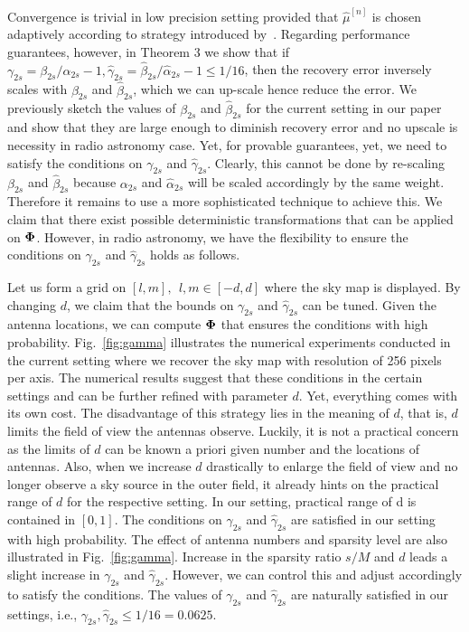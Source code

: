 \documentclass[aoas,preprint]{imsart}
\numberwithin{equation}{section}
\theoremstyle{plain}
\begin{document}
{Convergence is trivial in low precision setting provided that $\hat{\mu}^{[n]}$ is chosen adaptively according to strategy introduced by~\cite{blumensath2010niht}. Regarding performance guarantees, however, in Theorem 3 we show that if $\gamma_{2s} = \beta_{2s}/\alpha_{2s}-1, \hat{\gamma}_{2s} = \hat{\beta}_{2s}/\hat{\alpha}_{2s}-1\leq 1/16$, then the recovery error inversely scales with $\beta_{2s}$ and $\hat{\beta}_{2s}$, which we can up-scale hence reduce the error. We previously sketch the values of $\beta_{2s}$ and $\hat{\beta}_{2s}$ for the current setting in our paper and show that they are large enough to diminish recovery error and no upscale is necessity in radio astronomy case. Yet, for provable guarantees, yet, we need to satisfy the conditions on $\gamma_{2s}$ and $\hat{\gamma}_{2s}$. Clearly, this cannot be done by re-scaling $\beta_{2s}$ and $\hat{\beta}_{2s}$ because $\alpha_{2s}$ and $\hat{\alpha}_{2s}$ will be scaled accordingly by the same weight. Therefore it remains to use a more sophisticated technique to achieve this. We claim that there exist possible deterministic transformations that can be applied on ${\bf \Phi}$. However, in radio astronomy, we have the flexibility to ensure the conditions on $\gamma_{2s}$ and $\hat{\gamma}_{2s}$ holds as follows. 
\vspace{0.5em}

Let us form a grid on $[l, m], \  \ l, m \in [-d, d]$ where the sky map is displayed. By changing $d$, we claim that the bounds on $\gamma_{2s}$ and $\hat{\gamma}_{2s}$ can be tuned. Given the antenna locations, we can compute ${\bf \Phi}$ that ensures the conditions with high probability. Fig.~\ref{fig:gamma} illustrates the numerical experiments conducted in the current setting where we recover the sky map with resolution of 256 pixels per axis. The numerical results suggest that these conditions in the certain settings and can be further refined with parameter $d$. Yet, everything comes with its own cost. The disadvantage of this strategy lies in the meaning of $d$, that is, $d$ limits the field of view the antennas observe. Luckily, it is not a practical concern as the limits of $d$ can be known a priori given number and the locations of antennas. Also, when we increase $d$ drastically to enlarge the field of view and no longer observe a sky source in the outer field, it already hints on the practical range of $d$ for the respective setting. In our setting, practical range of d is contained in $[0, 1]$. The conditions on $\gamma_{2s}$ and $\hat{\gamma}_{2s}$ are satisfied in our setting with high probability. The effect of antenna numbers and sparsity level are also illustrated in Fig.~\ref{fig:gamma}. Increase in the sparsity ratio $s/M$ and $d$ leads a slight increase in $\gamma_{2s}$ and $\hat{\gamma}_{2s}$. However, we can control this and adjust accordingly to satisfy the conditions. The values of $\gamma_{2s}$ and $\hat{\gamma}_{2s}$ are naturally satisfied in our settings, i.e., $\gamma_{2s}, \hat{\gamma}_{2s}\leq 1/16=0.0625$.



}
\end{document}
